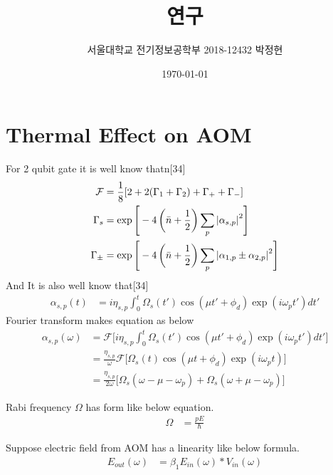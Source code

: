 \documentclass[%
 reprint,
 amsmath,amssymb,
 aps,
]{revtex4-2}
\begin{document}
\title{연구}

\author{서울대학교 전기정보공학부 2018-12432 박정현}
\date{\today}%
      
\maketitle


\section{\label{sec:level1}Thermal Effect on AOM}
For 2 qubit gate it is well know thatn[34]
\begin{align}
	\mathcal{F} &= \frac{1}{8}[2+2(\Gamma_{1}+\Gamma_{2})+\Gamma_{+}+\Gamma_{-}]\\
	\Gamma_{s} &= \exp\Bigg[-4\left(\bar{n}+\frac{1}{2}\right)\sum_{p} \abs{\alpha_{s,p}}^{2}\Bigg]\\
	\Gamma_{\pm} &= \exp\Bigg[-4\left(\bar{n}+\frac{1}{2}\right)\sum_{p} \abs{\alpha_{1,p}\pm\alpha_{2,p}}^{2}\Bigg]	
\end{align}
And It is also well know that[34]
\begin{align}
	\alpha_{s,p}(t) &= i\eta_{s,p}\int_{0}^{t}\Omega_{s}(t')\cos(\mu t' + \phi_{d})\exp(i\omega_{p}t')dt'
\end{align}
Fourier transform makes equation as below
\begin{align}
	\alpha_{s,p}(\omega) &=  \mathcal{F}\Bigg[i\eta_{s,p}\int_{0}^{t}\Omega_{s}(t')\cos(\mu t' + \phi_{d})\exp(i\omega_{p}t')dt'\Bigg]\\
	&= \frac{\eta_{s,p}}{\omega}\mathcal{F}\Bigg[\Omega_{s}(t)\cos(\mu t + \phi_{d})\exp(i\omega_{p}t)\Bigg]\\
	&= \frac{\eta_{s,p}}{2\omega}\Bigg[\Omega_{s}(\omega - \mu - \omega_{p})+\Omega_{s}(\omega + \mu - \omega_{p})\Bigg]
\end{align}

Rabi frequency $\Omega$ has form like below equation.
\begin{align}
	\Omega &= \frac{pE}{\hbar}
\end{align}

Suppose electric field from AOM has a linearity like below formula.
\begin{align}
	E_{out}(\omega) &= \beta_{1} E_{in} (\omega) * V_{in}(\omega)
\end{align}
\end{document}
